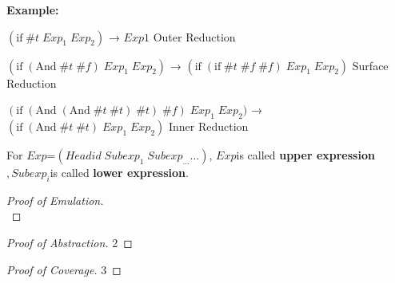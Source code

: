 {\bfseries Example:}

$(\mbox{if}\; \#t\; Exp_{1}\; Exp_{2})$ → $Exp1$ \hfill Outer Reduction

$(\mbox{if}\; (\mbox{And}\; \#t\; \#f)\; Exp_{1}\; Exp_{2})$ → $(\mbox{if}\; (\mbox{if}\; \#t\; \#f\; \#f)\; Exp_{1}\; Exp_{2})$ \hfill Surface Reduction

$(\mbox{if}\; (\mbox{And}\; (\mbox{And}\; \#t\; \#t)\; \#t)\; \#f)\; Exp_{1}\; Exp_{2})$ → $(\mbox{if}\; (\mbox{And}\; \#t\; \#t)\; Exp_{1}\; Exp_{2})$ \hfill Inner Reduction

\begin{Def}
For $Exp$=$(Headid\;Subexp_{1}\;Subexp_{\ldots} \ldots)$, $Exp$is called {\bfseries upper expression}$,Subexp_{i}$is called {\bfseries lower expression}.
\end{Def}

\begin{proof}[Proof of Emulation]
\hfill\\

\end{proof}

\begin{proof}[Proof of Abstraction]
2
\end{proof}

\begin{proof}[Proof of Coverage]
3
\end{proof}
